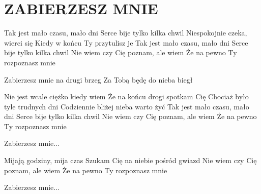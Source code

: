 \documentclass[../../../songbook.tex]{subfiles}
\begin{document}
\TabPositions{8cm} %
\section*{ZABIERZESZ MNIE}
{}
\vspace{0.5cm}
Tak jest mało czasu, mało dni		 \newline
Serce bije tylko kilka chwil		 \newline
Niespokojnie czeka, wierci się		 \newline
Kiedy w końcu Ty przytulisz je		 \newline
Tak jest mało czasu, mało dni		 \newline
Serce bije tylko kilka chwil		 \newline
Nie wiem czy Cię poznam, ale wiem	 \newline
Że na pewno Ty rozpoznasz mnie		 \newline

\-\hspace{1cm} Zabierzesz mnie na drugi brzeg	 \newline
\-\hspace{1cm} Za Tobą będę do nieba biegł		 \newline

Nie jest wcale ciężko kiedy wiem			 \newline
Że na końcu drogi spotkam Cię			 \newline
Chociaż było tyle trudnych dni			 \newline
Codziennie bliżej nieba warto żyć			 \newline
Tak jest mało czasu, mało dni			 \newline
Serce bije tylko kilka chwil			 \newline
Nie wiem czy Cię poznam, ale wiem			 \newline
Że na pewno Ty rozpoznasz mnie			 \newline

\-\hspace{1cm} Zabierzesz mnie...			 \newline

Mijają godziny, mija czas			 \newline
Szukam Cię na niebie pośród gwiazd			 \newline
Nie wiem czy Cię poznam, ale wiem			 \newline
Że na pewno Ty rozpoznasz mnie			 \newline

\-\hspace{1cm} Zabierzesz mnie... 			 \newline
\end{document}
